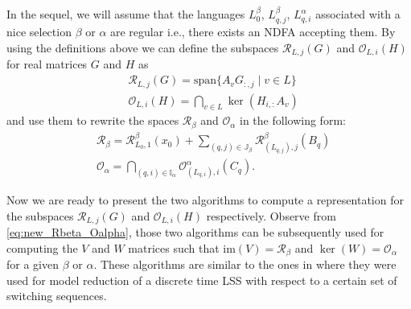 \documentclass[journal]{IEEEtran}
\newcommand{\IM}{\mathrm{im}}
\newcommand{\SPAN}{\mathrm{span}}
\begin{document}
In the sequel, we will assume that the languages $L^\beta_0$, $L^\beta_{q,j}$, $L^\alpha_{q,i}$ associated with a nice selection $\beta$ or $\alpha$ are regular i.e., there exists an NDFA accepting them. By using the definitions above  we can define the subspaces $\mathscr{R}_{L,j}(G)$ and $\mathscr{O}_{L,i}(H)$ for real matrices $G$ and $H$ as
\begin{align*}
	& \mathscr{R}_{L,j}(G)= \SPAN \{ A_vG_{:,j} \mid v \in L \} \\
	& \mathscr{O}_{L,i}(H)= \bigcap_{v \in L} \ker (H_{i,:}A_v)
\end{align*}
and use them to rewrite the spaces $\mathscr{R}_{\beta}$ and $\mathscr{O}_{\alpha}$ in the following form:
\begin{align} \label{eq:new_Rbeta_Oalpha}
	& \mathscr{R}_{\beta}= \mathscr{R}^{\beta}_{L_0,1}(x_0) + \sum\limits_{(q,j) \in \mathbb{J}_\beta}^{}\mathscr{R}^{\beta}_{(L_{q,j}),j}(B_q) \\
	& \mathscr{O}_{\alpha} = \bigcap_{(q,i) \in \mathbb{I}_\alpha} \mathscr{O}^{\alpha}_{(L_{q,i}),i}(C_q).
\end{align}

Now we are ready to present the two algorithms to compute a representation for the subspaces $\mathscr{R}_{L,j}(G)$ and $\mathscr{O}_{L,i}(H)$ respectively. Observe from \eqref{eq:new_Rbeta_Oalpha}, those two algorithms can be subsequently used for computing the $V$ and $W$ matrices such that $\IM (V) = \mathscr{R}_{\beta}$ and $\ker(W) = \mathscr{O}_{\alpha}$ for a given $\beta$ or $\alpha$. These algorithms are similar to the ones in \cite{bastugCDC2014} where they were used for model reduction of a discrete time LSS with respect to a certain set of switching sequences.
\end{document}
